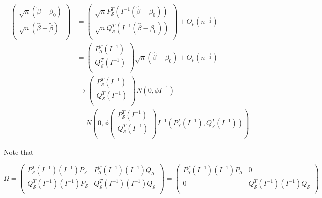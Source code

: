 \documentclass[11pt,fleqn]{book} %
\begin{document}
		\begin{align*}
			\begin{pmatrix}
			\sqrt{n}(\tilde{\beta} - \beta_0)\\
			\sqrt{n}(\hat{\beta} - \tilde{\beta})\\
			\end{pmatrix} &= 
					\begin{pmatrix}
						\sqrt{n}P^T_\mathcal{S}(I^{-1}(\hat{\beta} - \beta_0))\\
						\sqrt{n}Q^T_\mathcal{S}(I^{-1}(\hat{\beta} - \beta_0))\\
					\end{pmatrix} +
								O_p(n^{-\frac{1}{2}})\\
				&=  \begin{pmatrix}
						P^T_\mathcal{S}(I^{-1})\\
						Q^T_\mathcal{S}(I^{-1})\\
					\end{pmatrix} \sqrt{n} (\hat{\beta} - \beta_0) + O_p(n^{-\frac{1}{2}})\\
				&\rightarrow 	\begin{pmatrix}
						P^T_\mathcal{S}(I^{-1})\\
						Q^T_\mathcal{S}(I^{-1})\\
					\end{pmatrix} N(0, \phi I^{-1})\\
				&= N(0, \phi \begin{pmatrix}
						P^T_\mathcal{S}(I^{-1})\\
						Q^T_\mathcal{S}(I^{-1})\\
					\end{pmatrix}I^{-1} (P^T_\mathcal{S}(I^{-1}), Q^T_\mathcal{S}(I^{-1})))	
		\end{align*}

		Note that

			$$\Omega = \begin{pmatrix}
				P^T_\mathcal{S}(I^{-1}) (I^{-1})P_\mathcal{S} & P^T_\mathcal{S}(I^{-1})(I^{-1}) Q_\mathcal{S}\\
				Q^T_\mathcal{S}(I^{-1}) (I^{-1})P_\mathcal{S} & Q^T_\mathcal{S}(I^{-1})(I^{-1}) Q_\mathcal{S}\\
			\end{pmatrix} = \begin{pmatrix}
				P^T_\mathcal{S}(I^{-1}) (I^{-1})P_\mathcal{S} & 0\\
				0 & Q^T_\mathcal{S}(I^{-1})(I^{-1}) Q_\mathcal{S}\\
			\end{pmatrix} $$
\end{document}

